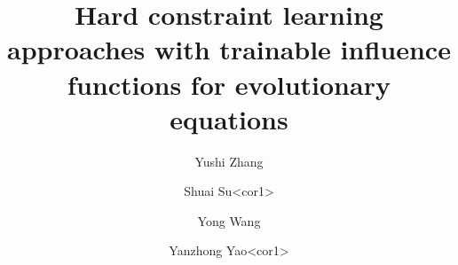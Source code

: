 \documentclass[preprint]{elsarticle}
\numberwithin{table}{section}
\numberwithin{equation}{section}
\numberwithin{figure}{section}
\def\corref#1{<#1>}%
\begin{document}
\newcommand{\hei}{\CJKfamily{hei}}%


\begin{CJK}{UTF8}{gbsn}
\begin{frontmatter}
\title{Hard constraint learning approaches with trainable influence functions for evolutionary equations}
\author[1,2,3]{Yushi Zhang} 
\author[4]{Shuai Su\corref{cor1}}
\author[2]{Yong Wang}
\author[1,3]{Yanzhong Yao\corref{cor1}}




\address[1]{Institute of Applied Physics and Computational
Mathematics, Beijing 100088, China}
\address[2]{Graduate School of China Academy of Engineering Physics, Beijing 100088, China}
\address[3]{National Key Laboratory of Computational Physics, Beijing 100088, China}
\address[4]{School of Mathematics, Statistics and Mechanics, Beijing University of Technology, Beijing 100124, China}

\begin{abstract}



\end{abstract}
\end{frontmatter}
\end{CJK}
\end{document}
